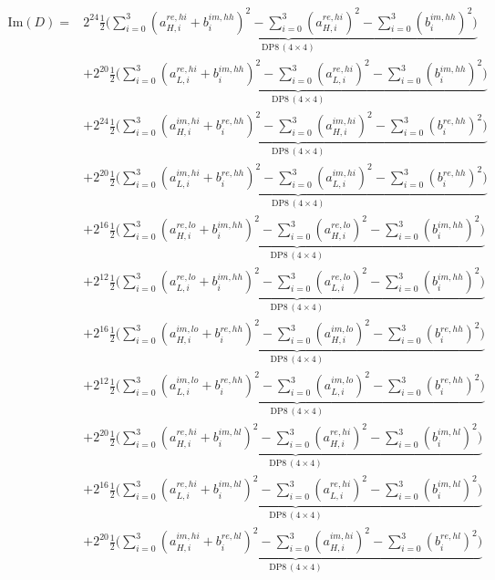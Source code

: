 \documentclass[fleqn]{article}
\newcommand{\DPop}[3]{\mathrm{DP#1}\,(#2\!\times\!#3)}
\begin{document}
\begin{align*}
\mathrm{Im}(D) = {}
  & 2^{24}\underbrace{\tfrac{1}{2}\Big(\sum_{i=0}^{3}(a_{H,i}^{re,hi}{+}b_i^{im,hh})^2 - \sum_{i=0}^{3}(a_{H,i}^{re,hi})^2 - \sum_{i=0}^{3}(b_i^{im,hh})^2\Big)}_{\DPop{8}{4}{4}} \\[0.5em]
  & + 2^{20}\underbrace{\tfrac{1}{2}\Big(\sum_{i=0}^{3}(a_{L,i}^{re,hi}{+}b_i^{im,hh})^2 - \sum_{i=0}^{3}(a_{L,i}^{re,hi})^2 - \sum_{i=0}^{3}(b_i^{im,hh})^2\Big)}_{\DPop{8}{4}{4}} \\[0.5em]
  & + 2^{24}\underbrace{\tfrac{1}{2}\Big(\sum_{i=0}^{3}(a_{H,i}^{im,hi}{+}b_i^{re,hh})^2 - \sum_{i=0}^{3}(a_{H,i}^{im,hi})^2 - \sum_{i=0}^{3}(b_i^{re,hh})^2\Big)}_{\DPop{8}{4}{4}} \\[0.5em]
  & + 2^{20}\underbrace{\tfrac{1}{2}\Big(\sum_{i=0}^{3}(a_{L,i}^{im,hi}{+}b_i^{re,hh})^2 - \sum_{i=0}^{3}(a_{L,i}^{im,hi})^2 - \sum_{i=0}^{3}(b_i^{re,hh})^2\Big)}_{\DPop{8}{4}{4}} \\[0.5em]
  & + 2^{16}\underbrace{\tfrac{1}{2}\Big(\sum_{i=0}^{3}(a_{H,i}^{re,lo}{+}b_i^{im,hh})^2 - \sum_{i=0}^{3}(a_{H,i}^{re,lo})^2 - \sum_{i=0}^{3}(b_i^{im,hh})^2\Big)}_{\DPop{8}{4}{4}} \\[0.5em]
  & + 2^{12}\underbrace{\tfrac{1}{2}\Big(\sum_{i=0}^{3}(a_{L,i}^{re,lo}{+}b_i^{im,hh})^2 - \sum_{i=0}^{3}(a_{L,i}^{re,lo})^2 - \sum_{i=0}^{3}(b_i^{im,hh})^2\Big)}_{\DPop{8}{4}{4}} \\[0.5em]
  & + 2^{16}\underbrace{\tfrac{1}{2}\Big(\sum_{i=0}^{3}(a_{H,i}^{im,lo}{+}b_i^{re,hh})^2 - \sum_{i=0}^{3}(a_{H,i}^{im,lo})^2 - \sum_{i=0}^{3}(b_i^{re,hh})^2\Big)}_{\DPop{8}{4}{4}} \\[0.5em]
  & + 2^{12}\underbrace{\tfrac{1}{2}\Big(\sum_{i=0}^{3}(a_{L,i}^{im,lo}{+}b_i^{re,hh})^2 - \sum_{i=0}^{3}(a_{L,i}^{im,lo})^2 - \sum_{i=0}^{3}(b_i^{re,hh})^2\Big)}_{\DPop{8}{4}{4}} \\[0.5em]
  & + 2^{20}\underbrace{\tfrac{1}{2}\Big(\sum_{i=0}^{3}(a_{H,i}^{re,hi}{+}b_i^{im,hl})^2 - \sum_{i=0}^{3}(a_{H,i}^{re,hi})^2 - \sum_{i=0}^{3}(b_i^{im,hl})^2\Big)}_{\DPop{8}{4}{4}} \\[0.5em]
  & + 2^{16}\underbrace{\tfrac{1}{2}\Big(\sum_{i=0}^{3}(a_{L,i}^{re,hi}{+}b_i^{im,hl})^2 - \sum_{i=0}^{3}(a_{L,i}^{re,hi})^2 - \sum_{i=0}^{3}(b_i^{im,hl})^2\Big)}_{\DPop{8}{4}{4}} \\[0.5em]
  & + 2^{20}\underbrace{\tfrac{1}{2}\Big(\sum_{i=0}^{3}(a_{H,i}^{im,hi}{+}b_i^{re,hl})^2 - \sum_{i=0}^{3}(a_{H,i}^{im,hi})^2 - \sum_{i=0}^{3}(b_i^{re,hl})^2\Big)}_{\DPop{8}{4}{4}} \\[0.5em]

\end{align*}
\end{document}
